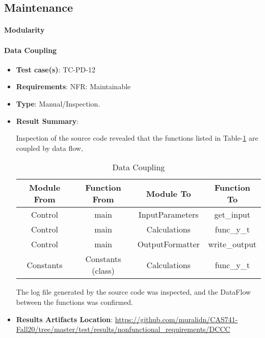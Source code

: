 \documentclass[12pt, titlepage]{article}
\begin{document}
\subsection{Maintenance}

\paragraph{Modularity}

\paragraph{Data Coupling}

\begin{itemize}

\item \textbf{Test case(s)}: TC-PD-12

\item \textbf{Requirements}: NFR: Maintainable

\item \textbf{Type}: Manual/Inspection.

\item \textbf{Result Summary}: 

 Inspection of the source code revealed that the functions listed in Table-\ref{tab:dataCoupling} 
are coupled by data flow,

\begin{table}[]
\caption{Data Coupling}
\label{tab:dataCoupling}
\begin{tabular}{c|c|c|c}
\multicolumn{1}{c|}{Module From} & \multicolumn{1}{c|}{Function From} & Module To         & Function To     \\ \hline
Control                      & main                           & InputParameters & get\_input    \\
Control                      & main                           & Calculations    & func\_y\_t    \\
Control                      & main                           & OutputFormatter & write\_output \\
Constants                   & Constants (class)         & Calculations    & func\_y\_t    \\
\end{tabular}
\end{table}

The log file generated by the source code was inspected, and the DataFlow between the 
functions was confirmed. 

\item \textbf{Results Artifacts Location}:  \url{https://github.com/muralidn/CAS741-Fall20/tree/master/test/results/nonfunctional_requirements/DCCC}

\end{itemize}
\end{document}
